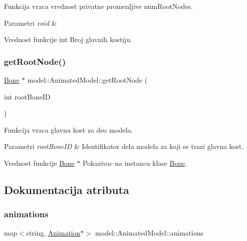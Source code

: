 Funkcija vraca vrednost privatne promenljive num\+Root\+Nodes. 


\begin{DoxyParams}{Parametri}
{\em void} & \\
\hline
\end{DoxyParams}
\begin{DoxyReturn}{Vrednost funkcije}
int Broj glavnih kostiju. 
\end{DoxyReturn}
\mbox{\label{classmodel_1_1AnimatedModel_a1056ac7c71920cd1ff123d372a9dd05d}} 
\subsubsection{\texorpdfstring{get\+Root\+Node()}{getRootNode()}}
{\footnotesize\ttfamily \hyperlink{classmodel_1_1Bone}{Bone} $\ast$ model\+::\+Animated\+Model\+::get\+Root\+Node (\begin{DoxyParamCaption}\item[{int}]{root\+Bone\+ID }\end{DoxyParamCaption})}



Funkcija vraca glavnu kost za deo modela. 


\begin{DoxyParams}{Parametri}
{\em root\+Bone\+ID} & Identifikator dela modela za koji se trazi glavna kost. \\
\hline
\end{DoxyParams}
\begin{DoxyReturn}{Vrednost funkcije}
\hyperlink{classmodel_1_1Bone}{Bone} $\ast$ Pokazivac na instancu klase \hyperlink{classmodel_1_1Bone}{Bone}. 
\end{DoxyReturn}


\subsection{Dokumentacija atributa}
\mbox{\label{classmodel_1_1AnimatedModel_ae366eb62ff617640a6b7a4aee86ff273}} 
\subsubsection{\texorpdfstring{animations}{animations}}
{\footnotesize\ttfamily map$<$string, \hyperlink{classanimation_1_1Animation}{Animation}$\ast$$>$ model\+::\+Animated\+Model\+::animations\hspace{0.3cm}{\ttfamily [private]}}



